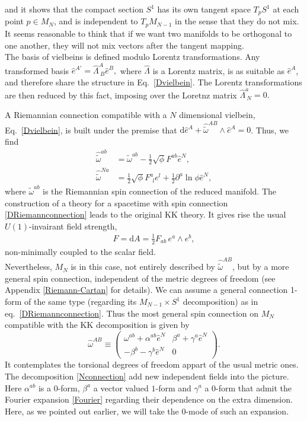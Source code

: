 \documentclass[aps,prd,12pt,superscriptaddress,showpacs,showkeys,longbibliography,reprint]{revtex4-1}
\begin{document}
and it shows that the compact section $S^1$ has its own tangent space $T_pS^1$ at each point $p\in M_N$, and is independent to $T_pM_{N-1}$ in the sense that they do not mix. It seems reasonable to think that if we want two manifolds to be orthogonal to one another, they will not mix vectors after the tangent mapping.\\
The basis of vielbeins is defined modulo Lorentz transformations. Any transformed basis 
$
\hat{e}^{A\prime}=\hat{\Lambda}^A_{\ B}\hat{e}^B,
$
where $\hat{\Lambda}$ is a Lorentz matrix, is as suitable as $\hat{e}^A$, and therefore share the structure in Eq.~\eqref{Dvielbein}. The Lorentz transformations are then reduced by this fact, imposing over the Loretnz matrix 
$\hat{\Lambda}^a_{\ N}=0.
$



A Riemannian connection compatible with a $N$ dimensional vielbein, Eq.~\eqref{Dvielbein}, is built under the premise that $\mbox{d}\hat{e}^A + \hat{\tilde{\omega}}^{AB} \wedge \hat{e}^A = 0$. Thus, we find
\begin{align}
  \label{DRiemannconnection}
  \hat{\tilde{\omega}}^{ab}&=\tilde{\omega}^{ab}-\frac{1}{2}\sqrt{\phi}F^{ab}\hat{e}^N,\\
  \hat{\tilde{\omega}}^{Na}&=\frac{1}{2}\sqrt{\phi}F^a_{\ \ l}e^l+\frac{1}{2}\partial^a\ln\phi\hat{e}^N,
\end{align}
where $\tilde{\omega}^{ab}$ is the Riemannian spin connection of the reduced manifold. The construction of a theory for a spacetime with spin connection \eqref{DRiemannconnection} leads to the original KK theory. It gives rise the usual $U(1)$-invairant field strength, 
\begin{align*}
F=\text{d}A=\frac{1}{2}F_{ab}\, e^a\wedge e^b,
\end{align*} 
non-minimally coupled to the scalar field.\\
Nevertheless, $M_N$ is in this case, not entirely described by $\hat{\tilde{\omega}}^{AB}$, but by a more general spin connection, independent of the metric degrees of freedom (see Appendix \ref{Riemann-Cartan} for details). We can assume a general connection 1-form of the same type (regarding its $M_{N-1}\times S^1$ decomposition) as in eq.~\eqref{DRiemannconnection}. Thus
the most general spin connection on $M_N$ compatible with the KK decomposition is given by 
\begin{equation}\label{Nconnection}
  \hat{\omega}^{AB} \equiv
  \begin{pmatrix}
    \omega^{ab}+\alpha^{ab}\hat{e}^N&\beta^a+\gamma^a\hat{e}^N\\
    -\beta^b-\gamma^b\hat{e}^N&0
  \end{pmatrix}.
\end{equation}
It contemplates the torsional degrees of freedom appart of the usual metric ones. 
The decomposition \eqref{Nconnection} add new independent fields into the picture. Here $\alpha^{ab}$ is a $0$-form, $\beta^a$ a vector valued $1$-form and $\gamma^a$ a $0$-form that admit the Fourier expansion \eqref{Fourier} regarding their dependence on the extra dimension. Here, as we pointed out earlier, we will take the $0$-mode of such an expansion.
\end{document}
